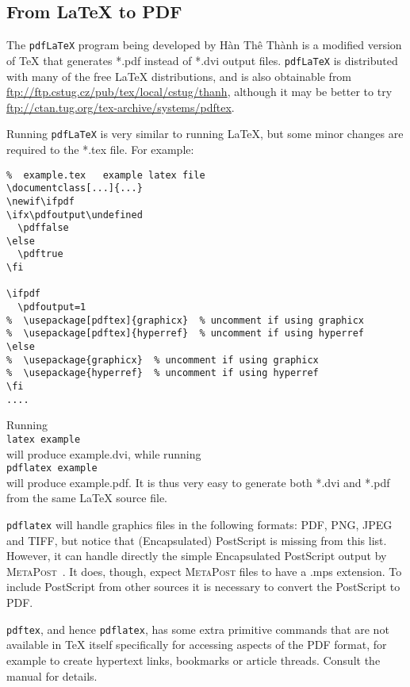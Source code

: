 \documentclass[11pt]{article}
\newif\ifpdf
\newcommand{\file}[1]{\textsf{#1}}
\newcommand{\program}[1]{\texttt{#1}}
\newcommand{\mpost}{\textsc{MetaPost}}
\newcommand{\Han}{H\`{a}n Th\^{e} Th\`{a}nh}
\newcommand{\tex}{TeX}
\newcommand{\latex}{LaTeX}
\begin{document}
\subsection{From LaTeX to PDF}

    The \program{pdfLaTeX} program being developed by \Han{} is a modified
version of \tex{} that generates \file{*.pdf} instead of \file{*.dvi} output
files. \program{pdfLaTeX} is distributed with many of the free \latex{}
distributions, and is also obtainable from 
\url{ftp://ftp.cstug.cz/pub/tex/local/cstug/thanh}, although it may be 
better to try \url{ftp://ctan.tug.org/tex-archive/systems/pdftex}.

    Running \program{pdfLaTeX} is very similar to running \latex, but some
minor changes are required to the \file{*.tex} file. For example: \label{code:example}
\begin{verbatim}
%  example.tex   example latex file
\documentclass[...]{...}
\newif\ifpdf
\ifx\pdfoutput\undefined
  \pdffalse
\else
  \pdftrue
\fi

\ifpdf
  \pdfoutput=1
%  \usepackage[pdftex]{graphicx}  % uncomment if using graphicx
%  \usepackage[pdftex]{hyperref}  % uncomment if using hyperref
\else
%  \usepackage{graphicx}  % uncomment if using graphicx
%  \usepackage{hyperref}  % uncomment if using hyperref
\fi
....
\end{verbatim}  

Running \\
\texttt{latex example} \\
will produce \file{example.dvi}, while running \\
\texttt{pdflatex example} \\
will produce \file{example.pdf}. It is thus very easy to generate both 
\file{*.dvi} and \file{*.pdf} from the same \latex{} source file.

    \program{pdflatex} will handle graphics files in the following formats:
PDF, PNG, JPEG and TIFF, but notice that (Encapsulated) PostScript is
missing from this list. However, it can handle directly the simple 
Encapsulated PostScript output by \mpost~\cite{HOBBY92}.
It does, though, expect \mpost{} files to have a \file{.mps} extension.
To include PostScript from other sources it is necessary to convert the
PostScript to PDF.

    \program{pdftex}, and hence \program{pdflatex}, has some extra 
primitive commands
that are not available in \tex{} itself specifically for accessing aspects
of the PDF format, for example to create hypertext links, bookmarks or 
article threads. Consult the manual for details.
\end{document}
